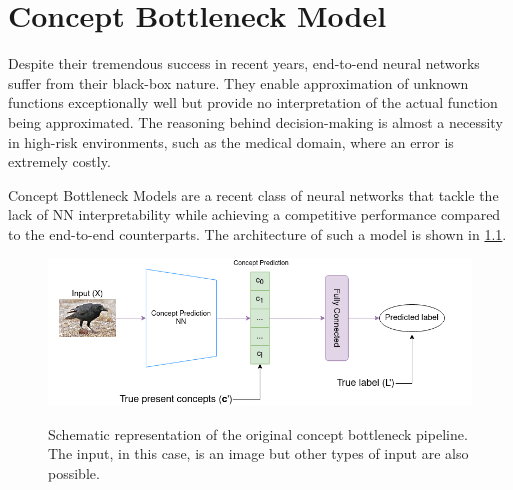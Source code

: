 \chapter{Concept Bottleneck Model}
\label{concept-bottleneck-pipeline}







Despite their tremendous success in recent years, end-to-end neural networks suffer from their black-box nature.
They enable approximation of unknown functions exceptionally well but provide no interpretation of the actual function being approximated.
The reasoning behind decision-making is almost a necessity in high-risk environments, such as the medical domain, where an error is extremely costly.

Concept Bottleneck Models \cite{RefWorks:RefID:35-koh2020concept} are a recent class of neural networks that tackle the lack of NN interpretability while achieving a competitive performance compared to the end-to-end counterparts. 
The architecture of such a model is shown in \ref{original-concept-bottleneck}.

\begin{figure}[h]
\caption{Schematic representation of the original concept bottleneck pipeline. The input, in this case, is an image but other types of input are also possible.}
\vspace{5pt}
\centering
\includegraphics[width=\textwidth]{concept-bottleneck-pipeline/original-concept-bottleneck-model.png}
\label{original-concept-bottleneck}
\end{figure}

